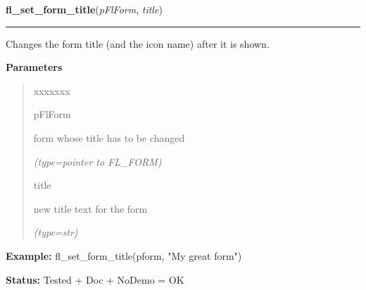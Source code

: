     \vspace{0.5ex}

\hspace{.8\funcindent}\begin{boxedminipage}{\funcwidth}

    \raggedright \textbf{fl\_set\_form\_title}(\textit{pFlForm}, \textit{title})

    \vspace{-1.5ex}

    \rule{\textwidth}{0.5\fboxrule}
\setlength{\parskip}{2ex}
    Changes the form title (and the icon name) after it is shown.

\setlength{\parskip}{1ex}
      \textbf{Parameters}
      \vspace{-1ex}

      \begin{quote}
        \begin{Ventry}{xxxxxxx}

          \item[pFlForm]

          form whose title has to be changed

            {\it (type=pointer to FL\_FORM)}

          \item[title]

          new title text for the form

            {\it (type=str)}

        \end{Ventry}

      \end{quote}

\textbf{Example:} fl\_set\_form\_title(pform, "My great form")



\textbf{Status:} Tested + Doc + NoDemo = OK



    \end{boxedminipage}

    \label{xformslib:flbasic:fl_set_app_mainform}

    \vspace{0.5ex}

